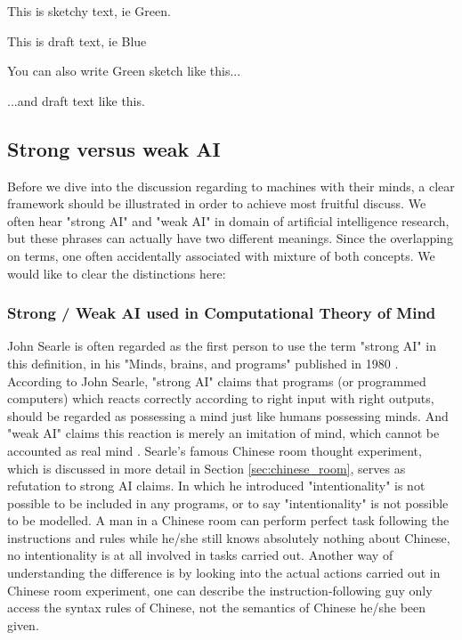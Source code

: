 \documentclass[11pt]{article}
\newcommand{\sk}[1]{{\color{dark-green-2} #1}}
\newcommand{\dr}[1]{{\color{dark-cornflower-blue-2} #1}}
\newenvironment{sketch}{\color{dark-green-2}}{\ignorespacesafterend}
\newenvironment{draft}{\color{dark-cornflower-blue-2}}{\ignorespacesafterend}
\begin{document}
\sk{This is sketchy text, ie Green.}

\dr{This is draft text, ie Blue}

\begin{sketch}
You can also write Green sketch like this...
\end{sketch}

\begin{draft}
...and draft text like this.
\end{draft}


\subsection{Strong versus weak AI}

\begin{draft}
Before we dive into the discussion regarding to machines with their minds, a clear framework should be illustrated in order to achieve most fruitful discuss. We often hear "strong AI" and "weak AI" in domain of artificial intelligence research, but these phrases can actually have two different meanings. Since the overlapping on terms, one often accidentally associated with mixture of both concepts. We would like to clear the distinctions here: 

\subsubsection*{Strong / Weak AI used in Computational Theory of Mind}

John Searle is often regarded as the first person to use the term "strong AI" in this definition, in his "Minds, brains, and programs" published in 1980 \cite{searle1980minds}. According to John Searle, "strong AI" claims that programs (or programmed computers) which reacts correctly according to right input with right outputs, should be regarded as possessing a mind just like humans possessing minds. And "weak AI" claims this reaction is merely an imitation of mind, which cannot be accounted as real mind . Searle's famous Chinese room thought experiment, which is discussed in more detail in Section \ref{sec:chinese_room}, serves as refutation to strong AI claims. In which he introduced "intentionality" is not possible to be included in any programs, or to say "intentionality" is not possible to be modelled. A man in a Chinese room can perform perfect task following the instructions and rules while he/she still knows absolutely nothing about Chinese, no intentionality is at all involved in tasks carried out. Another way of understanding the difference is by looking into the actual actions carried out in Chinese room experiment, one can describe the instruction-following guy only access the syntax rules of Chinese, not the semantics of Chinese he/she been given.


\end{draft}
\end{document}
